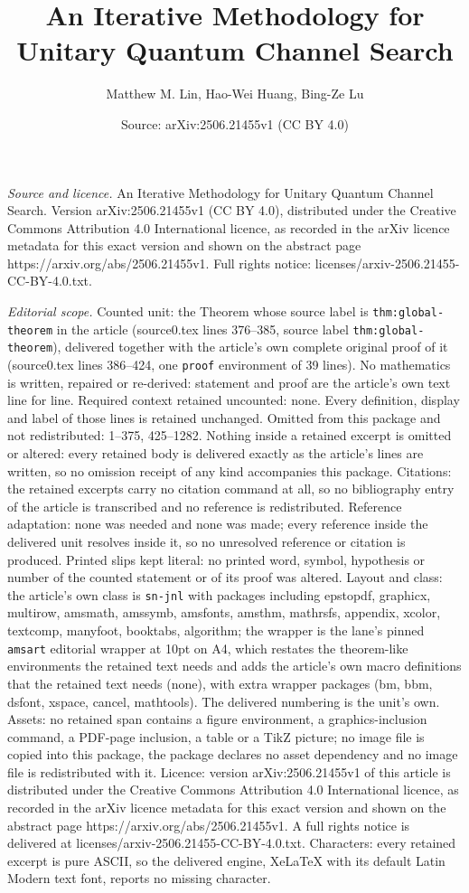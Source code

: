\documentclass[10pt,a4paper]{amsart}
\title[An Iterative Methodology for Unitary Quantum Channel Search]{An Iterative Methodology for Unitary Quantum Channel Search}
\author{Matthew M. Lin, Hao-Wei Huang, Bing-Ze Lu}
\date{Source: arXiv:2506.21455v1 (CC BY 4.0)}
\begin{document}
\maketitle

\noindent\emph{Source and licence.} An Iterative Methodology for Unitary Quantum Channel Search. Version arXiv:2506.21455v1 (CC BY 4.0), distributed under the Creative Commons Attribution 4.0 International licence, as recorded in the arXiv licence metadata for this exact version and shown on the abstract page https://arxiv.org/abs/2506.21455v1. Full rights notice: licenses/arxiv-2506.21455-CC-BY-4.0.txt.\par\smallskip

\noindent\textit{Editorial scope.} Counted unit: the Theorem whose source label is \texttt{thm:global-theorem} in the article (source0.tex lines 376--385, source label \texttt{thm:global-theorem}), delivered together with the article's own complete original proof of it (source0.tex lines 386--424, one \texttt{proof} environment of 39 lines). No mathematics is written, repaired or re-derived: statement and proof are the article's own text line for line. Required context retained uncounted: none. Every definition, display and label of those lines is retained unchanged. Omitted from this package and not redistributed: 1--375, 425--1282. Nothing inside a retained excerpt is omitted or altered: every retained body is delivered exactly as the article's lines are written, so no omission receipt of any kind accompanies this package. Citations: the retained excerpts carry no citation command at all, so no bibliography entry of the article is transcribed and no reference is redistributed. Reference adaptation: none was needed and none was made; every reference inside the delivered unit resolves inside it, so no unresolved reference or citation is produced. Printed slips kept literal: no printed word, symbol, hypothesis or number of the counted statement or of its proof was altered. Layout and class: the article's own class is \texttt{sn-jnl} with packages including epstopdf, graphicx, multirow, amsmath, amssymb, amsfonts, amsthm, mathrsfs, appendix, xcolor, textcomp, manyfoot, booktabs, algorithm; the wrapper is the lane's pinned \texttt{amsart} editorial wrapper at 10pt on A4, which restates the theorem-like environments the retained text needs and adds the article's own macro definitions that the retained text needs (none), with extra wrapper packages (bm, bbm, dsfont, xspace, cancel, mathtools). The delivered numbering is the unit's own. Assets: no retained span contains a figure environment, a graphics-inclusion command, a PDF-page inclusion, a table or a TikZ picture; no image file is copied into this package, the package declares no asset dependency and no image file is redistributed with it. Licence: version arXiv:2506.21455v1 of this article is distributed under the Creative Commons Attribution 4.0 International licence, as recorded in the arXiv licence metadata for this exact version and shown on the abstract page https://arxiv.org/abs/2506.21455v1. A full rights notice is delivered at licenses/arxiv-2506.21455-CC-BY-4.0.txt. Characters: every retained excerpt is pure ASCII, so the delivered engine, XeLaTeX with its default Latin Modern text font, reports no missing character.
\end{document}
